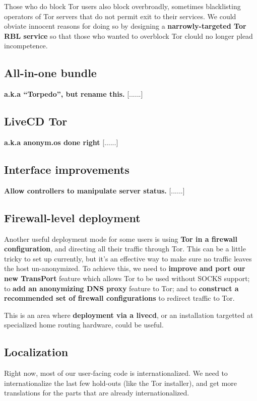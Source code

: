 \documentclass{article}
\newcommand{\tmp}[1]{{\bf #1} [......] \\}
\begin{document}
Those who do block Tor users also block overbroadly, sometimes blacklisting
operators of Tor servers that do not permit exit to their services.  We could
obviate innocent reasons for doing so by designing a {\bf narrowly-targeted Tor
  RBL service} so that those who wanted to overblock Tor clould no longer
plead incompetence.

\subsection{All-in-one bundle}
\tmp{a.k.a ``Torpedo'', but rename this.}

\subsection{LiveCD Tor}
\tmp{a.k.a anonym.os done right}

\subsection{Interface improvements}
\tmp{Allow controllers to manipulate server status.}


\subsection{Firewall-level deployment}
Another useful deployment mode for some users is using {\bf Tor in a firewall
  configuration}, and directing all their traffic through Tor.  This can be a
little tricky to set up currently, but it's an effective way to make sure no
traffic leaves the host un-anonymized.  To achieve this, we need to {\bf
  improve and port our new TransPort} feature which allows Tor to be used
without SOCKS support; to {\bf add an anonymizing DNS proxy} feature to Tor;
and to {\bf construct a recommended set of firewall configurations} to redirect
traffic to Tor.

This is an area where {\bf deployment via a livecd}, or an installation
targetted at specialized home routing hardware, could be useful.

\subsection{Localization}
Right now, most of our user-facing code is internationalized.  We need to
internationalize the last few hold-outs (like the Tor installer), and get
more translations for the parts that are already internationalized.
\end{document}
